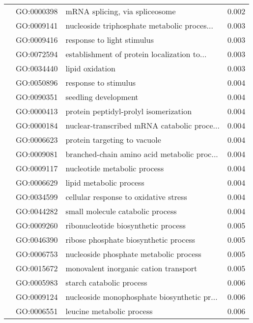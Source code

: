 \begin{longtable}{lllr}
   & GO:0000398 &               mRNA splicing, via spliceosome &         0.002 \\
   & GO:0009141 &  nucleoside triphosphate metabolic proces... &         0.003 \\
   & GO:0009416 &                   response to light stimulus &         0.003 \\
   & GO:0072594 &  establishment of protein localization to... &         0.003 \\
   & GO:0034440 &                              lipid oxidation &         0.003 \\
   & GO:0050896 &                         response to stimulus &         0.004 \\
   & GO:0090351 &                         seedling development &         0.004 \\
   & GO:0000413 &        protein peptidyl-prolyl isomerization &         0.004 \\
   & GO:0000184 &  nuclear-transcribed mRNA catabolic proce... &         0.004 \\
   & GO:0006623 &                 protein targeting to vacuole &         0.004 \\
   & GO:0009081 &  branched-chain amino acid metabolic proc... &         0.004 \\
   & GO:0009117 &                 nucleotide metabolic process &         0.004 \\
   & GO:0006629 &                      lipid metabolic process &         0.004 \\
   & GO:0034599 &        cellular response to oxidative stress &         0.004 \\
   & GO:0044282 &             small molecule catabolic process &         0.004 \\
   & GO:0009260 &          ribonucleotide biosynthetic process &         0.005 \\
   & GO:0046390 &        ribose phosphate biosynthetic process &         0.005 \\
   & GO:0006753 &       nucleoside phosphate metabolic process &         0.005 \\
   & GO:0015672 &        monovalent inorganic cation transport &         0.005 \\
   & GO:0005983 &                     starch catabolic process &         0.006 \\
   & GO:0009124 &  nucleoside monophosphate biosynthetic pr... &         0.006 \\
   & GO:0006551 &                    leucine metabolic process &         0.006 \\

\end{longtable}
